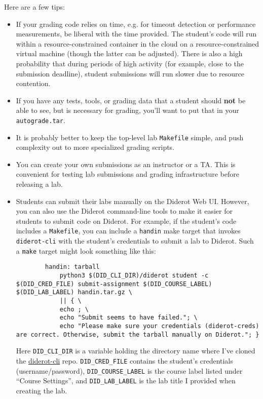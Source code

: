 Here are a few tips:
\begin{itemize}
    \item If your grading code relies on time, e.g. for timeout detection or 
        performance measurements, be liberal with the time provided. The student's code will
        run within a resource-constrained container in the cloud on a resource-constrained virtual machine
        (though the latter can be adjusted). There is also a high probability that during periods
        of high activity (for example, close to the submission deadline), student submissions
        will run slower due to resource contention. 

    \item If you have any tests, tools, or grading data that a student should \textbf{not} be able to see,
        but is necessary for grading, you'll want to put that in your \verb|autograde.tar|. 

    \item It is probably better to keep the top-level lab \verb|Makefile| simple, and push complexity out
        to more specialized grading scripts. 

    \item You can create your own submissions as an instructor or a TA. This is convenient for testing lab submissions
        and grading infrastructure before releasing a lab. 

    \item Students can submit their labs manually on the Diderot Web UI. However, you can also use the Diderot command-line tools to make it easier for students to submit code on Diderot. For example,
        if the student's code includes a \verb|Makefile|, you can include a \verb|handin| make target that invokes
        \verb|diderot-cli| with the student's credentials to submit a lab to Diderot. Such a \verb|make| target might look something like this:

        \begin{verbatim}
        handin: tarball
            python3 $(DID_CLI_DIR)/diderot student -c $(DID_CRED_FILE) submit-assignment $(DID_COURSE_LABEL) $(DID_LAB_LABEL) handin.tar.gz \
            || { \
            echo ; \
            echo "Submit seems to have failed."; \
            echo "Please make sure your credentials (diderot-creds) are correct. Otherwise, submit the tarball manually on Diderot."; }
        \end{verbatim}
        Here \verb|DID_CLI_DIR| is a variable holding the directory name where I've cloned the \href{https://github.com/diderot-edu/diderot-cli}{diderot-cli} repo. 
        \verb|DID_CRED_FILE| contains the student's credentials (username/password), \verb|DID_COURSE_LABEL| is the course label listed
        under ``Course Settings'', and \verb|DID_LAB_LABEL| is the lab title I provided when creating the lab. 

\end{itemize}
